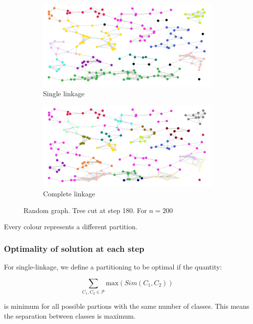 \documentclass[12pt,a4paper]{article}
\begin{document}
\begin{figure}
  \centering
  \begin{subfigure}[h]{0.49\textwidth}
    \includegraphics[width=\linewidth]{img/slink-200-180.png}
    \caption{Single linkage}
  \end{subfigure}
  \begin{subfigure}[h]{0.49\textwidth}
    \includegraphics[width=\linewidth]{img/clink-200-180.png}
    \caption{Complete linkage}
  \end{subfigure}
  \caption{Random graph. Tree cut at step 180. For $n = 200$}
  \label{fig:slink-vs-clink2}
\end{figure}

Every colour represents a different partition.

\subsubsection{Optimality of solution at each step}

For single-linkage, we define a partitioning to be optimal if the
quantity:

$$ \sum_{C_1, C_2 \in \mathcal{P}} \mathrm{max}(Sim(C_1, C_2)) $$

is minimum for all possible partions with the same number of
classes. This means the separation between classes is maximum.
\end{document}
